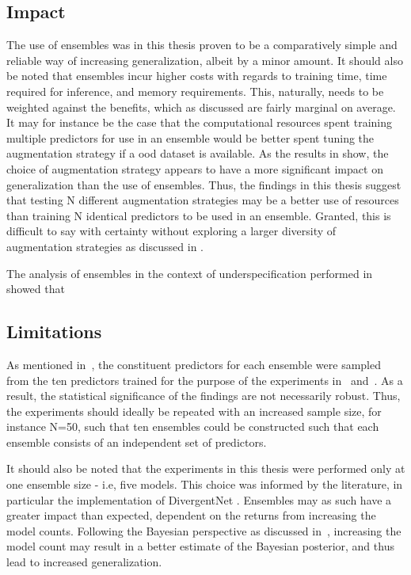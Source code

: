     \subsection{Impact}
    The use of ensembles was in this thesis proven to be a comparatively simple and reliable way of increasing generalization, albeit by a minor amount. It should also be noted that ensembles incur higher costs with regards to training time, time required for inference, and memory requirements. This, naturally, needs to be weighted against the benefits, which as discussed are fairly marginal on average. It may for instance be the case that the computational resources spent training multiple predictors for use in an ensemble would be better spent tuning the augmentation strategy if a \gls{ood} dataset is available. As the results in  show, the choice of augmentation strategy appears to have a more significant impact on generalization than the use of ensembles. Thus, the findings in this thesis suggest that testing N different augmentation strategies may be a better use of resources than training N identical predictors to be used in an ensemble. Granted, this is difficult to say with certainty without exploring a larger diversity of augmentation strategies as discussed in .
    
    The analysis of ensembles in the context of underspecification performed in  showed that
    
    \subsection{Limitations}
    As mentioned in~, the constituent predictors for each ensemble were sampled from the ten predictors trained for the purpose of the experiments in~ and~. As a result, the statistical significance of the findings are not necessarily robust. Thus, the experiments should ideally be repeated with an increased sample size, for instance N=50, such that ten ensembles could be constructed such that each ensemble consists of an independent set of predictors. 
    
    It should also be noted that the experiments in this thesis were performed only at one ensemble size - i.e, five models. This choice was informed by the literature, in particular the implementation of DivergentNet \cite{divergentnets}. Ensembles may as such have a greater impact than expected, dependent on the returns from increasing the model counts. Following the Bayesian perspective as discussed in~, increasing the model count may result in a better estimate of the Bayesian posterior, and thus lead to increased generalization.
    
